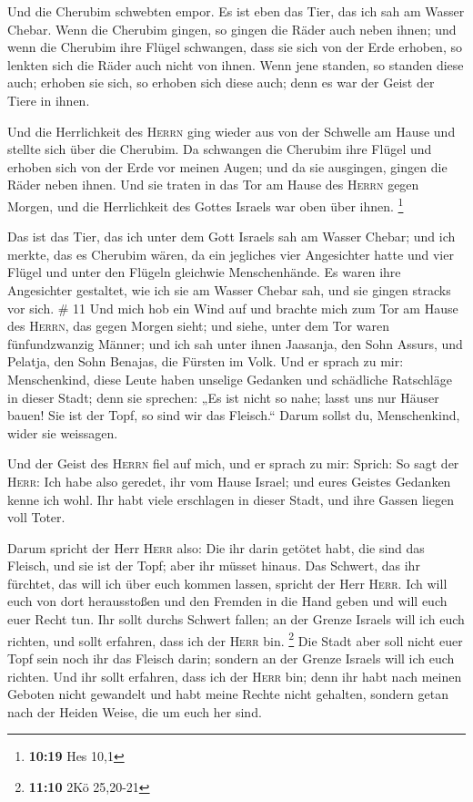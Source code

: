  Und die Cherubim schwebten empor. Es ist eben das Tier,
das ich sah am Wasser Chebar.  Wenn die Cherubim gingen,
so gingen die Räder auch neben ihnen; und wenn die Cherubim ihre Flügel
schwangen, dass sie sich von der Erde erhoben, so lenkten sich die Räder
auch nicht von ihnen.  Wenn jene standen, so standen
diese auch; erhoben sie sich, so erhoben sich diese auch; denn es war
der Geist der Tiere in ihnen.

 Und die Herrlichkeit des \textsc{Herrn} ging wieder aus
von der Schwelle am Hause und stellte sich über die Cherubim.
 Da schwangen die Cherubim ihre Flügel und erhoben sich
von der Erde vor meinen Augen; und da sie ausgingen, gingen die Räder
neben ihnen. Und sie traten in das Tor am Hause des \textsc{Herrn} gegen
Morgen, und die Herrlichkeit des Gottes Israels war oben über ihnen.
\footnote{\textbf{10:19} Hes 10,1}

 Das ist das Tier, das ich unter dem Gott Israels sah am
Wasser Chebar; und ich merkte, das es Cherubim wären,  da
ein jegliches vier Angesichter hatte und vier Flügel und unter den
Flügeln gleichwie Menschenhände.  Es waren ihre
Angesichter gestaltet, wie ich sie am Wasser Chebar sah, und sie gingen
stracks vor sich. \# 11  Und mich hob ein Wind auf und
brachte mich zum Tor am Hause des \textsc{Herrn}, das gegen Morgen
sieht; und siehe, unter dem Tor waren fünfundzwanzig Männer; und ich sah
unter ihnen Jaasanja, den Sohn Assurs, und Pelatja, den Sohn Benajas,
die Fürsten im Volk.  Und er sprach zu mir: Menschenkind,
diese Leute haben unselige Gedanken und schädliche Ratschläge in dieser
Stadt;  denn sie sprechen: „Es ist nicht so nahe; lasst
uns nur Häuser bauen! Sie ist der Topf, so sind wir das Fleisch.``
 Darum sollst du, Menschenkind, wider sie weissagen.

 Und der Geist des \textsc{Herrn} fiel auf mich, und er
sprach zu mir: Sprich: So sagt der \textsc{Herr}: Ich habe also geredet,
ihr vom Hause Israel; und eures Geistes Gedanken kenne ich wohl.
 Ihr habt viele erschlagen in dieser Stadt, und ihre
Gassen liegen voll Toter.

 Darum spricht der Herr \textsc{Herr} also: Die ihr darin
getötet habt, die sind das Fleisch, und sie ist der Topf; aber ihr
müsset hinaus.  Das Schwert, das ihr fürchtet, das will
ich über euch kommen lassen, spricht der Herr \textsc{Herr}.
 Ich will euch von dort herausstoßen und den Fremden in
die Hand geben und will euch euer Recht tun.  Ihr sollt
durchs Schwert fallen; an der Grenze Israels will ich euch richten, und
sollt erfahren, dass ich der \textsc{Herr} bin. \footnote{\textbf{11:10}
  2Kö 25,20-21}  Die Stadt aber soll nicht euer Topf sein
noch ihr das Fleisch darin; sondern an der Grenze Israels will ich euch
richten.  Und ihr sollt erfahren, dass ich der
\textsc{Herr} bin; denn ihr habt nach meinen Geboten nicht gewandelt und
habt meine Rechte nicht gehalten, sondern getan nach der Heiden Weise,
die um euch her sind.

